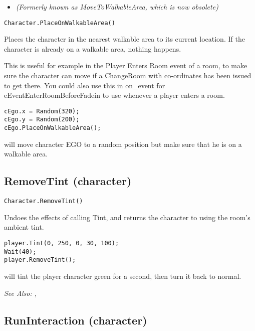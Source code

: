 \begin{itemize}
\item \it{(Formerly known as MoveToWalkableArea, which is now obsolete)}
\end{itemize}

\begin{verbatim}
Character.PlaceOnWalkableArea()
\end{verbatim}
Places the character in the nearest walkable area to its current location.
If the character is already on a walkable area, nothing happens.

This is useful for example in the Player Enters Room event of a room, to
make sure the character can move if a ChangeRoom with co-ordinates has been issued to get there.
You could also use this in on_event for eEventEnterRoomBeforeFadein to use whenever a
player enters a room.

\begin{verbatim}
cEgo.x = Random(320);
cEgo.y = Random(200);
cEgo.PlaceOnWalkableArea();
\end{verbatim}
will move character EGO to a random position but make sure that he is on a walkable area.


\subsection{RemoveTint (character)}\label{Character.RemoveTint}%

\begin{verbatim}
Character.RemoveTint()
\end{verbatim}

Undoes the effects of calling Tint, and returns the character to using the room's ambient tint.

\begin{verbatim}
player.Tint(0, 250, 0, 30, 100);
Wait(40);
player.RemoveTint();
\end{verbatim}
will tint the player character green for a second, then turn it back to normal.

\it{See Also:} ,


\subsection{RunInteraction (character)}\label{Character.RunInteraction}%


